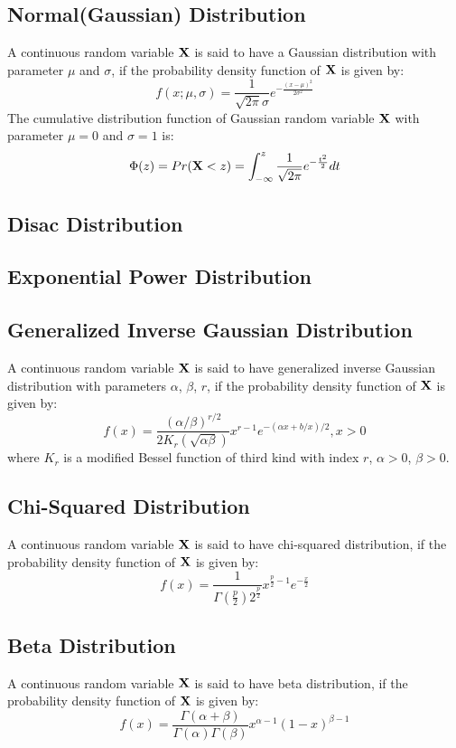 \documentclass[11pt]{article}
\def\X{{\bf X}}
\begin{document}
\subsection{Normal(Gaussian) Distribution}
A continuous random variable $\X$ is said to have a Gaussian distribution with parameter $\mu$ and $\sigma$, if the probability density function of $\X$ is given by:
\[f(x; \mu, \sigma) = \frac{1}{\sqrt{2\pi}\sigma} e^{-\frac{(x-\mu)^2}{2\sigma^2}}\]
The cumulative distribution function of Gaussian random variable $\X$ with parameter $\mu = 0$ and $\sigma = 1$ is:
\[\Phi(z) = Pr(\X < z) = \int_{-\infty}^z \frac{1}{\sqrt{2\pi}} e^{-\frac{t^2}{2}} dt\]

\subsection{Disac Distribution}

\subsection{Exponential Power Distribution}

\subsection{Generalized Inverse Gaussian Distribution}
A continuous random variable $\X$ is said to have generalized inverse Gaussian distribution with parameters $\alpha$, $\beta$, $r$, if the probability density function of $\X$ is given by:
\[f(x) = \frac{(\alpha / \beta)^{r/2}}{2 K_r(\sqrt{\alpha\beta})} x^{r-1} e^{-(\alpha x + b/x)/2}, x > 0\]
where $K_r$ is a modified Bessel function of third kind with index $r$, $\alpha > 0$, $\beta > 0$.

\subsection{Chi-Squared Distribution}
A continuous random variable $\X$ is said to have chi-squared distribution, if the probability density function of $\X$ is given by:
\[f(x) = \frac{1}{\Gamma(\frac{p}{2})2^{\frac{p}{2}}} x^{\frac{p}{2} - 1} e^{-\frac{x}{2}}\]

\subsection{Beta Distribution}
A continuous random variable $\X$ is said to have beta distribution, if the probability density function of $\X$ is given by:
\[f(x) = \frac{\Gamma(\alpha + \beta)}{\Gamma(\alpha)\Gamma(\beta)} x^{\alpha - 1} (1-x)^{\beta - 1}\]
\end{document}
